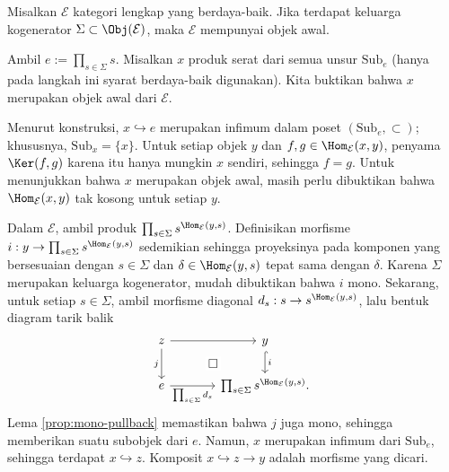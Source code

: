 \begin{lema}\label{prop:cogenerator-initial-obj}
	Misalkan $\mathcal{E}$ kategori lengkap yang berdaya-baik. Jika terdapat
	keluarga kogenerator $\Sigma\subset\Obj(\mathcal{E})$, maka
	$\mathcal{E}$ mempunyai objek awal.
\end{lema}
\begin{bukti}
	Ambil $e:=\prod_{s\in\Sigma}s$. Misalkan $x$ produk serat dari semua
	unsur $\mathrm{Sub}_e$ (hanya pada langkah ini syarat berdaya-baik
	digunakan). Kita buktikan bahwa $x$ merupakan objek awal dari
	$\mathcal{E}$.

	Menurut konstruksi, $x\hookrightarrow e$ merupakan infimum dalam poset
	$(\mathrm{Sub}_e,\subset)$; khususnya, $\mathrm{Sub}_x=\{x\}$. Untuk
	setiap objek $y$ dan $f,g\in\Hom_{\mathcal{E}}(x,y)$, penyama
	$\Ker(f,g)$ karena itu hanya mungkin $x$ sendiri, sehingga $f=g$. Untuk
	menunjukkan bahwa $x$ merupakan objek awal, masih perlu dibuktikan bahwa
	$\Hom_{\mathcal{E}}(x,y)$ tak kosong untuk setiap $y$.

	Dalam $\mathcal{E}$, ambil produk
	$\prod_{s\in\Sigma}s^{\Hom_{\mathcal{E}}(y,s)}$. Definisikan morfisme
	$i:y\to\prod_{s\in\Sigma}s^{\Hom_{\mathcal{E}}(y,s)}$ sedemikian sehingga
	proyeksinya pada komponen yang bersesuaian dengan $s\in\Sigma$ dan
	$\delta\in\Hom_{\mathcal{E}}(y,s)$ tepat sama dengan $\delta$. Karena
	$\Sigma$ merupakan keluarga kogenerator, mudah dibuktikan bahwa $i$ mono.
	Sekarang, untuk setiap $s\in\Sigma$, ambil morfisme diagonal
	$d_s:s\to s^{\Hom_{\mathcal{E}}(y,s)}$, lalu bentuk diagram tarik balik
	\[\begin{tikzcd}[column sep=large]
		z \arrow[r] \arrow[d, "j"'] & y \arrow[hookrightarrow, d, "i"] \arrow[phantom, ld, "\Box" description] \\
		e \arrow[r, "{\prod_{s \in \Sigma} d_s}"'] &  \prod_{s \in \Sigma} s^{\Hom_{\mathcal{E}}(y, s)}.
	\end{tikzcd}\]
	Lema \ref{prop:mono-pullback} memastikan bahwa $j$ juga mono, sehingga
	memberikan suatu subobjek dari $e$. Namun, $x$ merupakan infimum dari
	$\mathrm{Sub}_e$, sehingga terdapat $x\hookrightarrow z$. Komposit
	$x\hookrightarrow z\to y$ adalah morfisme yang dicari.
\end{bukti}

